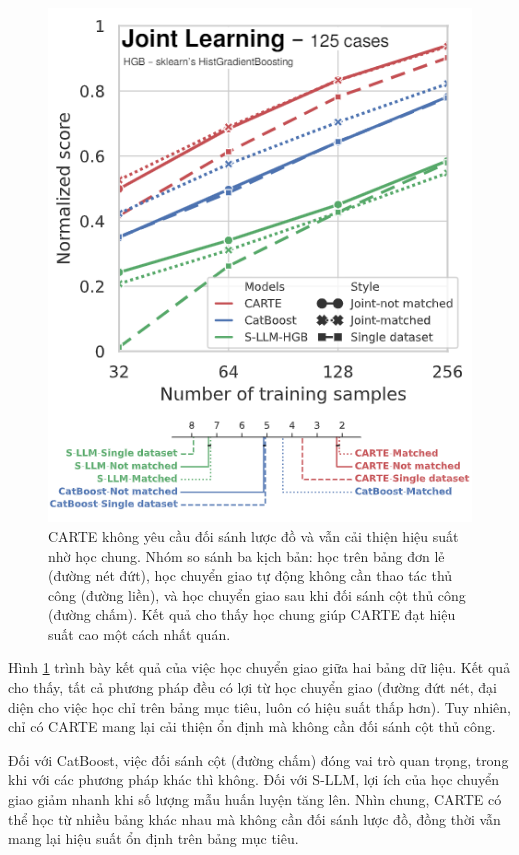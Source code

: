 \documentclass{article}
\begin{document}
\begin{figure} 
    \centering
    \includegraphics[scale = 0.7]{carte_schema_matching_not_required.png}
    \caption{CARTE không yêu cầu đối sánh lược đồ và vẫn cải thiện hiệu suất nhờ học chung. Nhóm so sánh ba kịch bản: học trên bảng đơn lẻ (đường nét đứt), học chuyển giao tự động không cần thao tác thủ công (đường liền), và học chuyển giao sau khi đối sánh cột thủ công (đường chấm). Kết quả cho thấy học chung giúp CARTE đạt hiệu suất cao một cách nhất quán.}
    \label{fig:carte_schema_matching_not_required}
\end{figure}

Hình \ref{fig:carte_schema_matching_not_required} trình bày kết quả của việc học chuyển giao giữa hai bảng dữ liệu. Kết quả cho thấy, tất cả phương pháp đều có lợi từ học chuyển giao (đường đứt nét, đại diện cho việc học chỉ trên bảng mục tiêu, luôn có hiệu suất thấp hơn). Tuy nhiên, chỉ có CARTE mang lại cải thiện ổn định mà không cần đối sánh cột thủ công.

Đối với CatBoost, việc đối sánh cột (đường chấm) đóng vai trò quan trọng, trong khi với các phương pháp khác thì không. Đối với S-LLM, lợi ích của học chuyển giao giảm nhanh khi số lượng mẫu huấn luyện tăng lên. Nhìn chung, CARTE có thể học từ nhiều bảng khác nhau mà không cần đối sánh lược đồ, đồng thời vẫn mang lại hiệu suất ổn định trên bảng mục tiêu.
\end{document}
